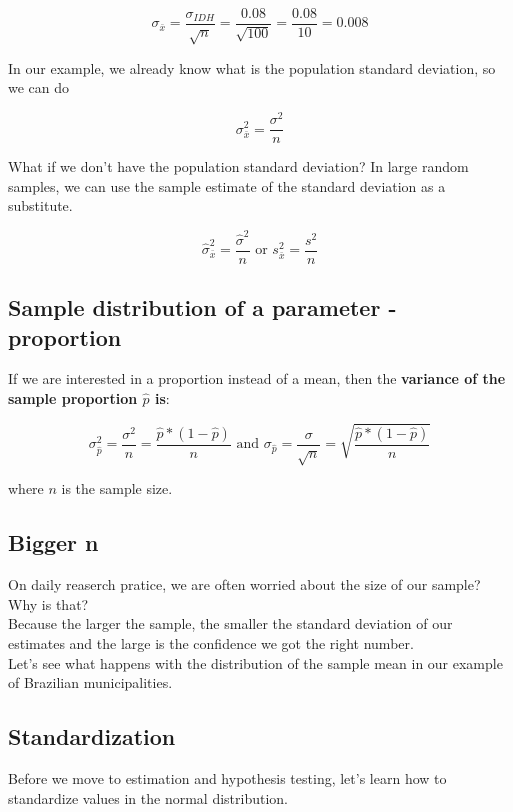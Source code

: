 \documentclass[11pt]{article}
\begin{document}
\[\sigma_{\bar{x}} = \frac{\sigma_{IDH}}{\sqrt{n}} = \frac{0.08}{\sqrt{100}} = \frac{0.08}{10} = 0.008\]

In our example, we already know what is the population standard deviation, so we can do

\[\sigma_{\bar{x}}^2 = \frac{\sigma^2}{n}\]

What if we don't have the population standard deviation? In large random samples, we can use the sample estimate of the standard deviation as a substitute.

\[\hat{\sigma}_{\bar{x}}^2 = \frac{\hat{\sigma}^2}{n} \text{  or  } s_{\bar{x}}^2 = \frac{s^2}{n}\]

	\subsection*{Sample distribution of a parameter - proportion}

	If we are interested in a proportion instead of a mean, then the \textbf{variance of the sample proportion $\hat{p}$ is}:

\[\sigma_{\hat{p}}^2 = \frac{\sigma^2}{n} = \frac{\hat{p} * (1-\hat{p})}{n} \text{ and }\sigma_{\hat{p}} = \frac{\sigma}{\sqrt{n}} = \sqrt{\frac{\hat{p} * (1-\hat{p})}{n}}\]

where $n$ is the sample size.


	\subsection*{Bigger n}

	On daily reaserch pratice, we are often worried about the size of our sample? Why is that?\\

	Because the larger the sample, the smaller the standard deviation of our estimates and the large is the confidence we got the right number.\\
	
	Let's see what happens with the distribution of the sample mean in our example of Brazilian municipalities.



	\subsection*{Standardization}
	Before we move to estimation and hypothesis testing, let's learn how to standardize values in the normal distribution.\\
	
\end{document}
